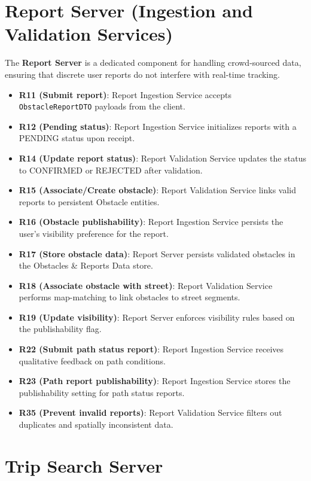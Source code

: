 \section*{Report Server (Ingestion and Validation Services)}

The \textbf{Report Server} is a dedicated component for handling crowd-sourced data, ensuring that discrete user reports do not interfere with real-time tracking.

\begin{itemize}
    \item \textbf{R11 (Submit report)}: Report Ingestion Service accepts \texttt{ObstacleReportDTO} payloads from the client.
    \item \textbf{R12 (Pending status)}: Report Ingestion Service initializes reports with a PENDING status upon receipt.
    \item \textbf{R14 (Update report status)}: Report Validation Service updates the status to CONFIRMED or REJECTED after validation.
    \item \textbf{R15 (Associate/Create obstacle)}: Report Validation Service links valid reports to persistent Obstacle entities.
    \item \textbf{R16 (Obstacle publishability)}: Report Ingestion Service persists the user's visibility preference for the report.
    \item \textbf{R17 (Store obstacle data)}: Report Server persists validated obstacles in the Obstacles \& Reports Data store.
    \item \textbf{R18 (Associate obstacle with street)}: Report Validation Service performs map-matching to link obstacles to street segments.
    \item \textbf{R19 (Update visibility)}: Report Server enforces visibility rules based on the publishability flag.
    \item \textbf{R22 (Submit path status report)}: Report Ingestion Service receives qualitative feedback on path conditions.
    \item \textbf{R23 (Path report publishability)}: Report Ingestion Service stores the publishability setting for path status reports.
    \item \textbf{R35 (Prevent invalid reports)}: Report Validation Service filters out duplicates and spatially inconsistent data.
\end{itemize}

\section*{Trip Search Server}

